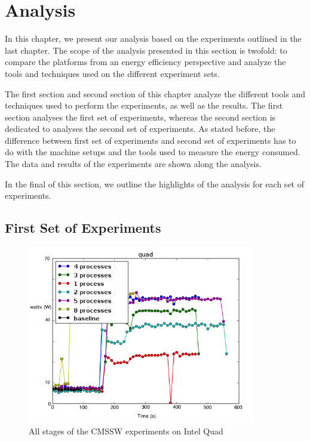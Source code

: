 \chapter{Analysis}



In this chapter, we present our analysis based on the experiments outlined in the last chapter. The scope of the analysis presented in this section is twofold: to compare the
platforms from an energy efficiency perspective and analyze the tools and techniques used on the different experiment sets. 


The first section and second section of this chapter analyze the different tools and techniques used
to perform the experiments, as well as the results. The first section analyses the first set of experiments, whereas the second section is dedicated to analyses the second set of experiments. As stated before, the difference between first set of experiments and second set of experiments has to do with the machine setups and the tools used to measure the energy consumed. The data and results of the experiments are shown along the analysis.

In the final of this section, we outline the highlights of the analysis for
each set of experiments.

\section{First Set of Experiments}

\begin{figure}[h]
  \centering
    \includegraphics[width=100mm]{"img/aalto/aalto_total_quad"}
    \caption{All stages of the CMSSW experiments on Intel Quad}
    \label{fig:aalto_quad_clamp}
\end{figure}



